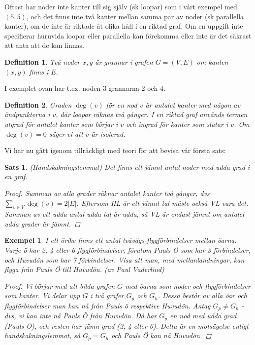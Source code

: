 \documentclass[10pt,a4paper]{article}
\newtheorem{defn}{Definition}
\newtheorem{sats}{Sats}
\theoremstyle{problem}
\newtheorem{example}{Exempel}
\begin{document}
Oftast har noder inte kanter till sig själv (sk loopar) som i vårt exempel med $(5, 5)$, och det finns inte två kanter mellan samma par av noder (sk parallella kanter), om de inte är riktade åt olika
håll i en riktad graf. Om en uppgift inte specifierar huruvida loopar eller parallella kan förekomma eller inte är det säkrast att anta att de kan finnas.

\begin{defn}
Två noder $x, y$ är grannar i grafen $G = (V, E)$ om kanten $(x, y)$ finns i $E$.
\end{defn}

I exemplet ovan har t.ex. noden 3 grannarna 2 och 4.

\begin{defn}
Graden $\deg(v)$ för en nod $v$ är antalet kanter med någon av ändpunkterna i $v$, där loopar räknas två gånger. I en riktad graf används termen \emph{utgrad} för antalet kanter som börjar i $v$ och \emph{ingrad}
för kanter som slutar i $v$. Om $\deg(v) = 0$ säger vi att $v$ är \emph{isolerad}.
\end{defn}


Vi har nu gått igenom tillräckligt med teori för att bevisa vår första sats:

\begin{sats}
\emph{(Handskakningslemmat)}
    Det finns ett jämnt antal noder med udda grad i en graf.
\begin{proof}
    Summan av alla grader räknar antalet kanter två gånger, dvs $\sum_{v \in V}{\deg(v)} = 2|E|$.
    Eftersom HL är ett jämnt tal måste också VL vara det. Summan av ett udda antal udda tal är udda,
    så VL är endast jämnt om antalet udda grader är jämnt.
\end{proof}
\end{sats}


\begin{example}
I ett örike finns ett antal tvåvägs-flygförbindelser mellan öarna. Varje ö har 2, 4 eller 6 flygförbindelser, förutom Pauls Ö som har 3 förbindelser,
och Huvudön som har 7 förbindelser. Visa att man, med mellanlandningar, kan flyga från Pauls Ö till Huvudön. (av Paul Vaderlind)
\begin{proof}
Vi börjar med att bilda grafen $G$ med öarna som noder och flygförbindelser som kanter. Vi delar upp $G$ i två grafer $G_p$ och $G_h$. Dessa består av alla
öar och flygförbindelser man kan nå från Pauls ö respektive Huvudön. Antag $G_p \not= G_h$ - dvs, vi kan inte nå Pauls Ö från Huvudön. Då har $G_p$ en nod med udda grad (Pauls Ö), och resten har jämn grad
(2, 4 eller 6). Detta är en motsägelse enligt handskakningslemmat, så $G_p = G_h$ och Pauls Ö kan nå Huvudön.
\end{proof}
\end{example}
\end{document}
